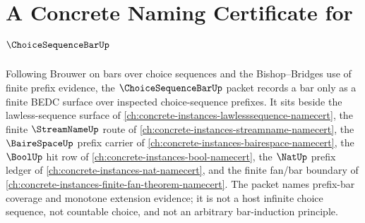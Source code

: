 \chapter{A Concrete Naming Certificate for $\ChoiceSequenceBarUp$}
\label{ch:concrete-instances-choice-sequence-bar-namecert}

Following Brouwer on bars over choice sequences and the Bishop--Bridges use of finite prefix evidence, the $\ChoiceSequenceBarUp$ packet records a bar only as a finite BEDC surface over inspected choice-sequence prefixes. It sits beside the lawless-sequence surface of \autoref{ch:concrete-instances-lawlesssequence-namecert}, the finite $\StreamNameUp$ route of \autoref{ch:concrete-instances-streamname-namecert}, the $\BaireSpaceUp$ prefix carrier of \autoref{ch:concrete-instances-bairespace-namecert}, the $\BoolUp$ hit row of \autoref{ch:concrete-instances-bool-namecert}, the $\NatUp$ prefix ledger of \autoref{ch:concrete-instances-nat-namecert}, and the finite fan/bar boundary of \autoref{ch:concrete-instances-finite-fan-theorem-namecert}. The packet names prefix-bar coverage and monotone extension evidence; it is not a host infinite choice sequence, not countable choice, and not an arbitrary bar-induction principle.

